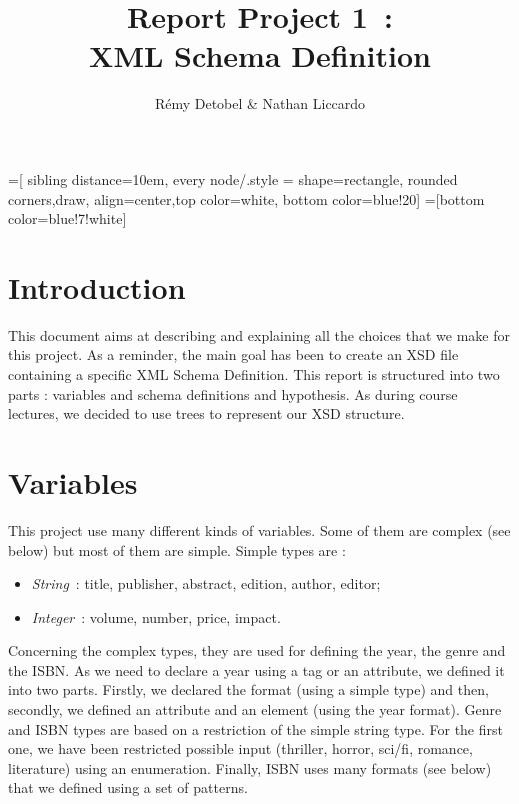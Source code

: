 \documentclass{article}
\author{R\'emy Detobel \& Nathan Liccardo}
\title{Report Project 1~:\\XML Schema Definition}
\begin{document}
=[
  sibling distance=10em,
  every node/.style = {shape=rectangle, rounded corners,draw, align=center,top color=white, bottom color=blue!20}]
=[bottom color=blue!7!white]

\maketitle

\section{Introduction}
This document aims at describing and explaining all the choices that we make for this project. As a reminder, the main goal has been to create an XSD file containing a specific XML Schema Definition. This report is structured into two parts : variables and schema definitions and hypothesis. As during course lectures, we decided to use trees to represent our XSD structure.
 
\section{Variables}
  \label{sec:variables}
This project use many different kinds of variables. Some of them are complex (see below) but most of them are simple. Simple types are : 
  \begin{itemize}
    \item \textit{String}~: title, publisher, abstract, edition, author, editor;
    \item \textit{Integer}~: volume, number, price, impact.
  \end{itemize}
Concerning the complex types, they are used for defining the year, the genre and the ISBN. As we need to declare a year using a tag or an attribute, we defined it into two parts. Firstly, we declared the format (using a simple type) and then, secondly, we defined an attribute and an element (using the year format). Genre and ISBN types are based on a restriction of the simple string type. For the first one, we have been restricted possible input (thriller, horror, sci/fi, romance, literature) using an enumeration. Finally, ISBN uses many formats (see below) that we defined using a set of patterns.
  
\end{document}
